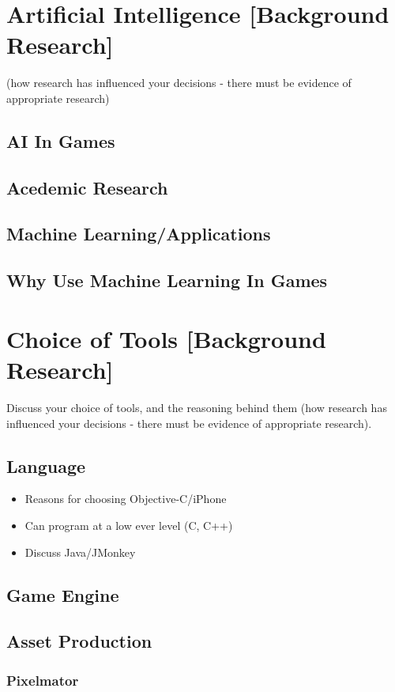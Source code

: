 \documentclass[runningheads,a4paper]{llncs}
\begin{document}
\section{Artificial Intelligence [Background Research]}
(how research has influenced your decisions - there must be evidence of appropriate research)

	\subsection{AI In Games}
	\subsection{Acedemic Research}
	\subsection{Machine Learning/Applications}	
	\subsection{Why Use Machine Learning In Games}

	
\section{Choice of Tools [Background Research]}
Discuss your choice of tools, and the reasoning behind them (how research has influenced your decisions - there must be evidence of appropriate research).

	\subsection{Language}
		\begin{itemize}
			\item Reasons for choosing Objective-C/iPhone
			\item Can program at a low ever level (C, C++)
			\item Discuss Java/JMonkey
		\end{itemize}
	\subsection{Game Engine}
	\subsection{Asset Production}
		\subsubsection{Pixelmator}
\end{document}
